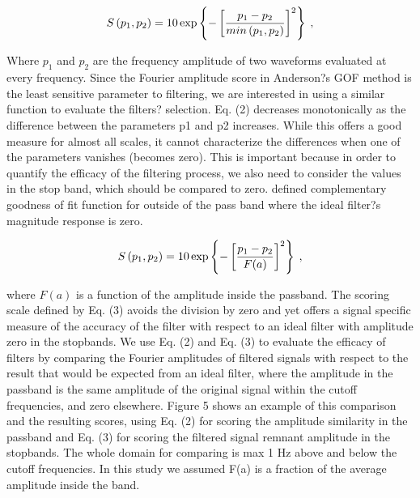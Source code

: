 \documentclass{article}
\begin{document}
% 
\begin{equation}
    \label{eq:s}
	S \left( p_1,p_2 \right) = 10 \exp \left\{ -\left[ \frac{p_1-p_2}{min \left(p_1,p_2\right)} \right]^2 \right\} 
    \hspace{0.25em},
\end{equation}
% 

Where $p_1$ and $p_2$ are the frequency amplitude of two waveforms evaluated at every frequency. Since the Fourier amplitude score in Anderson?s GOF method is the least sensitive parameter to filtering, we are interested in using a similar function to evaluate the filters? selection. Eq. (2) decreases monotonically as the difference between the parameters p1 and p2 increases. While this offers a good measure for almost all scales, it cannot characterize the differences when one of the parameters vanishes (becomes zero). This is important because in order to quantify the efficacy of the filtering process, we also need to consider the values in the stop band, which should be compared to zero. \citet{Khoshenvis_2015} defined complementary goodness of fit function for outside of the pass band where the ideal filter?s magnitude response is zero. 

% 
\begin{equation} 
    \label{eq:s-modified}
    S \left( p_1,p_2 \right) = 10 \exp \left\{ -\left[ \frac{p_1 - p_2}{F(a)} \right]^2 \right\} 
    \hspace{0.25em},
\end{equation}
% 

where $F(a)$ is a function of the amplitude inside the passband. The scoring scale defined by Eq. (3) avoids the division by zero and yet offers a signal specific measure of the accuracy of the filter with respect to an ideal filter with amplitude zero in the stopbands. We use Eq. (2) and Eq. (3) to evaluate the efficacy of filters by comparing the Fourier amplitudes of filtered signals with respect to the result that would be expected from an ideal filter, where the amplitude in the passband is the same amplitude of the original signal within the cutoff frequencies, and zero elsewhere. 
Figure 5 shows an example of this comparison and the resulting scores, using Eq. (2) for scoring the amplitude similarity in the passband and Eq. (3) for scoring the filtered signal remnant amplitude in the stopbands. The whole domain for comparing is max 1 Hz above and below the cutoff frequencies. In this study we assumed F(a) is a fraction of the average amplitude inside the band.
\end{document}
